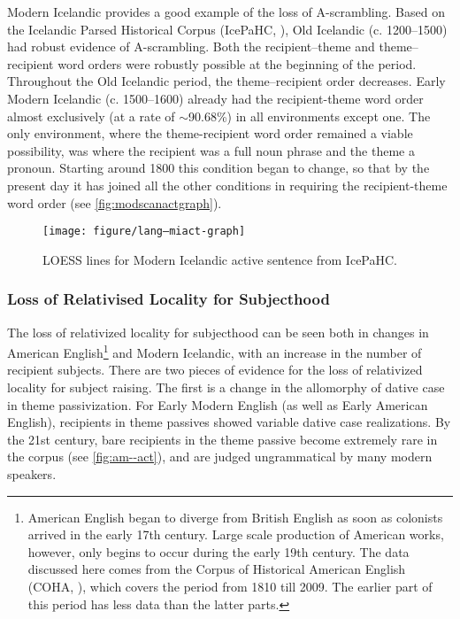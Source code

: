 Modern Icelandic provides a good example of the loss of A-scrambling. Based on the Icelandic Parsed Historical Corpus (IcePaHC, \cite{Wallenberg.2011}), Old Icelandic (c. 1200--1500) had robust evidence of A-scrambling. Both the recipient--theme and theme--recipient word orders were robustly possible at the beginning of the period. Throughout the Old Icelandic period, the theme--recipient order decreases. Early Modern Icelandic (c. 1500--1600) already had the recipient-theme word order almost exclusively (at a rate of $\sim$90.68\%) in all environments except one. The only environment, where the theme-recipient word order remained a viable possibility, was where the recipient was a full noun phrase and the theme a pronoun. Starting around 1800 this condition began to change, so that by the present day it has joined all the other conditions in requiring the recipient-theme word order (see \autoref{fig:modscanactgraph}).

\begin{knitrout}
\color{fgcolor}\begin{figure}[ht!]


{\centering \texttt{[image: figure/lang--miact-graph]} 

}

\caption[LOESS lines for Modern Icelandic active sentence from IcePaHC]{LOESS lines for Modern Icelandic active sentence from IcePaHC.\label{fig:modscanactgraph}\label{fig:miact-graph}}
\end{figure}


\end{knitrout}


\subsubsection{Loss of Relativised Locality for Subjecthood}\label{sec:lossofrlforsubject}



The loss of relativized locality for subjecthood can be seen both in changes in American English\footnote{American English began to diverge from British English as soon as colonists arrived in the early 17th century. Large scale production of American works, however, only begins to occur during the early 19th century. The data discussed here comes from the Corpus of Historical American English (COHA, \cite{Davies.2010}), which covers the period from 1810 till 2009. The earlier part of this period has less data than the latter parts.} and Modern Icelandic, with an increase in the number of recipient subjects. There are two pieces of evidence for the loss of relativized locality for subject raising. The first is a change in the allomorphy of dative case in theme passivization. For Early Modern English (as well as Early American English), recipients in theme passives showed variable dative case realizations. By the 21st century, bare recipients in the theme passive become extremely rare in the corpus (see \autoref{fig:am--act}), and are judged ungrammatical by many modern speakers.

